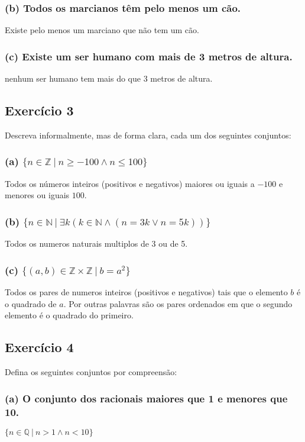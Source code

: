 \documentclass{article}
\begin{document}
\subsubsection*{(b) Todos os marcianos têm pelo menos um cão.}
Existe pelo menos um marciano que não tem um cão.

\subsubsection*{(c) Existe um ser humano com mais de 3 metros de altura.}
nenhum ser humano tem mais do que 3 metros de altura.

\subsection*{Exercício 3}
Descreva informalmente, mas de forma clara, cada um dos seguintes conjuntos:

\subsubsection*{(a) $\{n \in \mathbb{Z} \ | \ n \geq -100 \wedge n \leq 100\}$}
Todos os números inteiros (positivos e negativos) maiores ou iguais a $-100$ e menores ou iguais $100$.

\subsubsection*{(b) $\{n \in \mathbb{N} \ | \ \exists k (k \in \mathbb{N} \wedge (n = 3k \vee n = 5k))\}$}
Todos os numeros naturais multiplos de 3 ou de 5.

\subsubsection*{(c) $\{(a,b) \in \mathbb{Z} \times \mathbb{Z} \ | \ b = a^2\}$}
Todos os pares de numeros inteiros (positivos e negativos) tais que o elemento $b$ é o quadrado de $a$. Por outras palavras são os pares ordenados em que o segundo elemento é o quadrado do primeiro.

\subsection*{Exercício 4}
Defina os seguintes conjuntos por compreensão:

\subsubsection*{(a) O conjunto dos racionais maiores que 1 e menores que 10.}
$\{n \in \mathbb{Q} \ | \ n > 1 \wedge n < 10\}$
\end{document}
